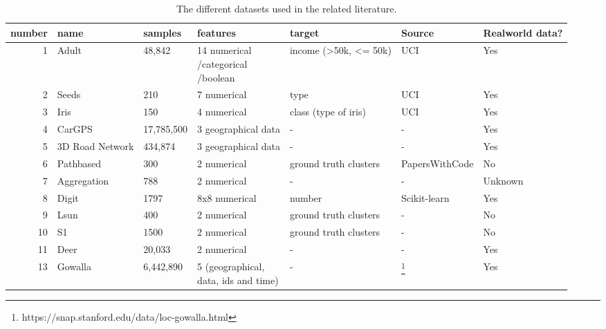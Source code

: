 \begin{landscape}
\begin{table}
        \begin{tabular}{rllllll}
            \toprule
            number & name            & samples    & features                      & target                & Source         & Realworld data? \\
            \midrule
            1      & Adult           & 48,842     & \makecell[l]{14 numerical                                                                \\ /categorical \\ /boolean}    & income (>50k, <= 50k) & UCI                                             & Yes             \\
            2      & Seeds           & 210        & 7 numerical                   & type                  & UCI            & Yes             \\
            3      & Iris            & 150        & 4 numerical                   & class (type of iris)  & UCI            & Yes             \\
            4      & CarGPS          & 17,785,500 & 3 geographical data           & -                     & -              & Yes             \\
            5      & 3D Road Network & 434,874    & 3 geographical data           & -                     & -              & Yes             \\
            6      & Pathbased       & 300        & 2 numerical                   & ground truth clusters & PapersWithCode & No              \\
            7      & Aggregation     & 788        & 2 numerical                   & -                     & -              & Unknown         \\
            8      & Digit           & 1797       & 8x8 numerical                 & number                & Scikit-learn   & Yes             \\
            9      & Lsun            & 400        & 2 numerical                   & ground truth clusters & -              & No              \\
            10     & S1              & 1500       & 2 numerical                   & ground truth clusters & -              & No              \\
            11     & Deer            & 20,033     & 2 numerical                   & -                     & -              & Yes             \\
            13     & Gowalla         & 6,442,890  & \makecell[l]{5 (geographical,                                                            \\ data, ids and time)} & -                     & \footnote{https://snap.stanford.edu/data/loc-gowalla.html} & Yes             \\
            \bottomrule
        \end{tabular}
        \caption{The different datasets used in the related literature.}
        \label{tab:datasets}
    \end{table}
\end{landscape}

